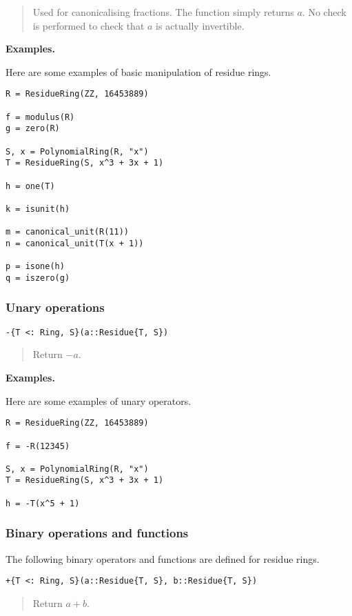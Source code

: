 \documentclass[a4paper,10pt]{article}
\newcommand{\desc}[1]{\vspace{-3mm}\begin{quote}#1\end{quote}}
\begin{document}
{{{\desc{Used for canonicalising fractions. The function simply returns $a$. No
check is performed to check that $a$ is actually invertible.}

\textbf{Examples.}

Here are some examples of basic manipulation of residue rings.

\begin{lstlisting}
R = ResidueRing(ZZ, 16453889)

f = modulus(R)
g = zero(R)

S, x = PolynomialRing(R, "x")
T = ResidueRing(S, x^3 + 3x + 1)

h = one(T)

k = isunit(h)

m = canonical_unit(R(11))
n = canonical_unit(T(x + 1))

p = isone(h)
q = iszero(g)
\end{lstlisting}

\subsubsection{Unary operations}

\begin{lstlisting}
-{T <: Ring, S}(a::Residue{T, S})
\end{lstlisting}

\desc{Return $-a$.}

\textbf{Examples.}

Here are some examples of unary operators.

\begin{lstlisting}
R = ResidueRing(ZZ, 16453889)

f = -R(12345)

S, x = PolynomialRing(R, "x")
T = ResidueRing(S, x^3 + 3x + 1)

h = -T(x^5 + 1)
\end{lstlisting}

\subsubsection{Binary operations and functions}

The following binary operators and functions are defined for residue rings.

\begin{lstlisting}
+{T <: Ring, S}(a::Residue{T, S}, b::Residue{T, S})
\end{lstlisting}

\desc{Return $a + b$.}

}}}
\end{document}
